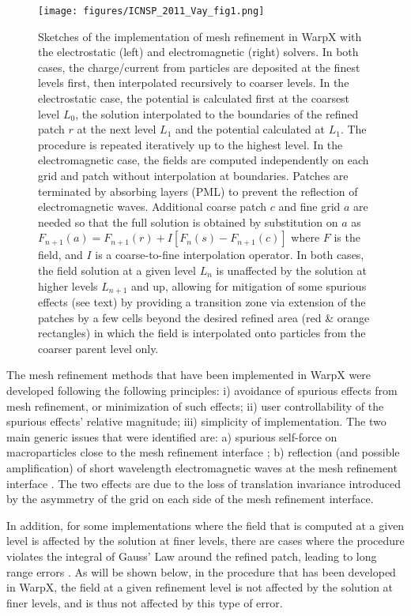 

\begin{figure}[htb]
  \centering
  \texttt{[image: figures/ICNSP\_2011\_Vay\_fig1.png]}
  \caption{Sketches of the implementation of mesh refinement in WarpX with the electrostatic (left) and electromagnetic (right) solvers. In both cases, the charge/current from particles are deposited at the finest levels first, then interpolated recursively to coarser levels. In the electrostatic case, the potential is calculated first at the coarsest level $L_0$, the solution interpolated to the boundaries of the refined patch $r$ at the next level $L_{1}$ and the potential calculated at $L_1$. The procedure is repeated iteratively up to the highest level.  In the electromagnetic case, the fields are computed independently on each grid and patch without interpolation at boundaries. Patches are terminated by absorbing layers (PML) to prevent the reflection of electromagnetic waves. Additional coarse patch $c$ and fine grid $a$ are needed so that the full solution is obtained by substitution on $a$ as $F_{n+1}(a)=F_{n+1}(r)+I[F_n( s )-F_{n+1}( c )]$ where $F$ is the field, and $I$ is a coarse-to-fine interpolation operator. In both cases, the field solution at a given level $L_n$ is unaffected by the solution at higher levels $L_{n+1}$ and up, allowing for mitigation of some spurious effects (see text) by providing a transition zone via extension of the patches by a few cells beyond the desired refined area (red \& orange rectangles) in which the field is interpolated onto particles from the coarser parent level only.} 
  \label{fig:ESAMR}
\end{figure}

The mesh refinement methods that have been implemented in WarpX were developed following the following principles: i) avoidance of spurious effects from mesh refinement, or minimization of such effects; ii) user controllability of the spurious effects' relative magnitude; iii) simplicity of implementation. The two main generic issues that were identified are: a) spurious self-force on macroparticles close to the mesh refinement interface \cite{Vaylpb2002,Colellajcp2010}; b) reflection (and possible amplification) of short wavelength electromagnetic waves at the mesh refinement interface \cite{Vayjcp01}. The two effects are due to the loss of translation invariance introduced by the asymmetry of the grid on each side of the mesh refinement interface. 

In addition, for some implementations where the field that is computed at a given level is affected by the solution at finer levels, there are cases where the procedure violates the integral of Gauss' Law around the refined patch, leading to long range errors \cite{Vaylpb2002,Colellajcp2010}. As will be shown below, in the procedure that has been developed in WarpX, the field at a given refinement level is not affected by the solution at finer levels, and is thus not affected by this type of error.

